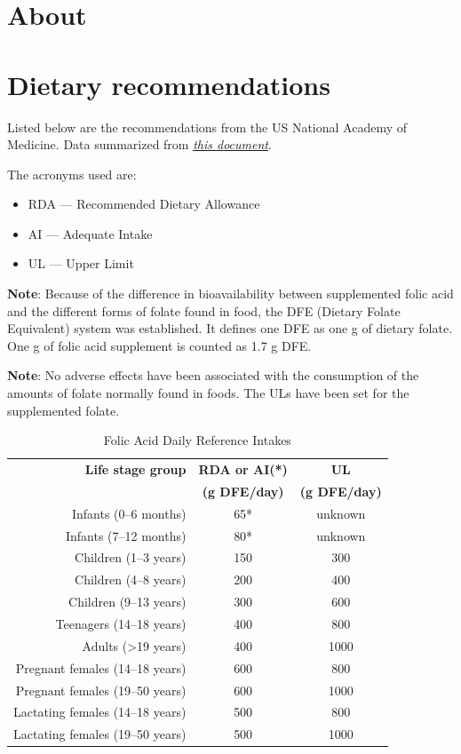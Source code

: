 \documentclass{book}
\begin{document}
\section{About}


\section{Dietary recommendations}
Listed below are the recommendations from the US National Academy of Medicine. Data summarized from \href{https://nap.nationalacademies.org/read/6015/chapter/10}{\textit{this document}}.

The acronyms used are:
\begin{itemize}
	\item RDA --- Recommended Dietary Allowance
	\item AI --- Adequate Intake
	\item UL --- Upper Limit
\end{itemize}

\textbf{Note}: Because of the difference in bioavailability between supplemented folic acid and the different forms of folate found in food, the DFE (Dietary Folate Equivalent) system was established. It defines one DFE as one \textmu g of dietary folate. One \textmu g of folic acid supplement is counted as 1.7 \textmu g DFE.

\textbf{Note}: No adverse effects have been associated with the consumption of the amounts of folate normally found in foods. The ULs have been set for the supplemented folate.

\begin{table}[h]
	\caption{Folic Acid Daily Reference Intakes}
	\centering \begin{tabular}{| r | c | c |}
		\hline
		\textbf{Life stage group} & \textbf{RDA or AI(*)} & \textbf{UL}\\
		& \textbf{(\textmu g DFE/day)} & \textbf{(\textmu g DFE/day)}\\ \hline
		Infants (0--6 months) & 65* & unknown\\ \hline
		Infants (7--12 months) & 80* & unknown\\ \hline
		Children (1--3 years) & 150 & 300\\ \hline
		Children (4--8 years) & 200 & 400\\ \hline
		Children (9--13 years) & 300 & 600\\ \hline
		Teenagers (14--18 years) & 400 & 800\\ \hline
		Adults (\textgreater19 years) & 400 & 1000\\ \hline
		Pregnant females (14--18 years) & 600 & 800\\ \hline
		Pregnant females (19--50 years) & 600 & 1000\\ \hline
		Lactating females (14--18 years) & 500 & 800\\ \hline
		Lactating females (19--50 years) & 500 & 1000\\ \hline
	\end{tabular}
\end{table}
\newpage
\end{document}

